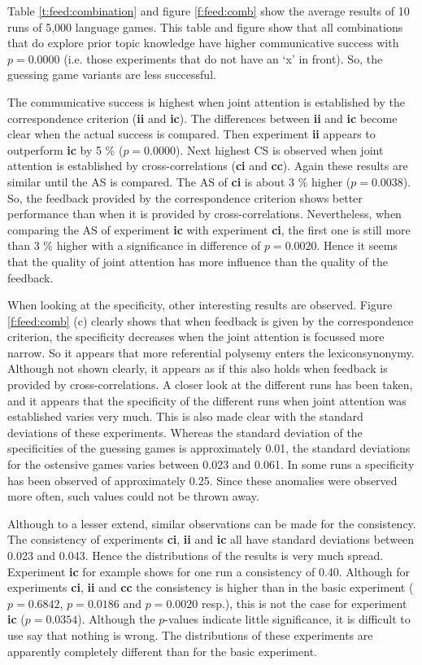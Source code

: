 Table \ref{t:feed:combination} and figure \ref{f:feed:comb} show the average results of 10 runs of 5,000 language games. This table and figure show that all combinations that do explore prior topic knowledge have higher communicative success with $p=0.0000$ (i.e. those experiments that do not have an `x' in front). So, the guessing game variants are less successful. 

The communicative success is highest when joint attention is established by the correspondence criterion ({\bf ii} and {\bf ic}). The differences between {\bf ii} and {\bf ic} become clear when the actual success is compared. Then experiment {\bf ii} appears to outperform {\bf ic} by 5 \% ($p=0.0000$). Next highest CS is observed when joint attention is established by cross-correlations ({\bf ci} and {\bf cc}). Again these results are similar until the AS is compared. The AS of {\bf ci} is about 3 \% higher ($p=0.0038$). So, the feedback provided by the correspondence criterion shows better performance than when it is provided by cross-correlations. Nevertheless, when comparing the AS of experiment {\bf ic} with experiment {\bf ci}, the first one is still more than 3 \% higher with a significance in difference of $p=0.0020$. Hence it seems that the quality of joint attention has more influence than the quality of the feedback. 

\p
When looking at the specificity, other interesting results are observed. Figure \ref{f:feed:comb} (c) clearly shows that when feedback is given by the correspondence criterion, the specificity decreases when the joint attention is focussed more narrow. So it appears that more referential polysemy enters the lexiconsynonymy. Although not shown clearly, it appears as if this also holds when feedback is provided by cross-correlations. A closer look at the different runs has been taken, and it appears that the specificity of the different runs when joint attention was established varies very much. This is also made clear with the standard deviations of these experiments. Whereas the standard deviation of the specificities of the guessing games is approximately 0.01, the standard deviations for the ostensive games varies between 0.023 and 0.061. In some runs a specificity has been observed of approximately 0.25. Since these anomalies were observed more often, such values could not be thrown away.

Although to a lesser extend, similar observations can be made for the consistency. The consistency of experiments {\bf ci}, {\bf ii} and {\bf ic} all have standard deviations between 0.023 and 0.043. Hence the distributions of the results is very much spread. Experiment {\bf ic} for example shows for one run a consistency of 0.40. Although for experiments {\bf ci}, {\bf ii} and {\bf cc} the consistency is higher than in the basic experiment ($p=0.6842$, $p=0.0186$ and $p=0.0020$ resp.), this is not the case for experiment {\bf ic} ($p=0.0354$). Although the $p$-values indicate little significance, it is difficult to use say that nothing is wrong. The distributions of these experiments are apparently completely different than for the basic experiment.

